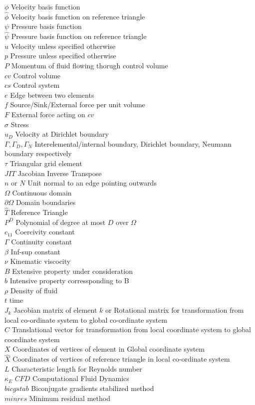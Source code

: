 \documentclass[a4paper,12pt]{book}
\begin{document}
$\phi$ Velocity basis function\\
$\hat{\phi}$ Velocity basis function on reference triangle\\
$\psi$ Pressure basis function\\
$\hat{\psi}$ Pressure basis function on reference triangle\\
$u$ Velocity unless specified otherwise\\
$p$ Pressure unless specified otherwise\\
$P$ Momentum of fluid flowing thorugh control volume\\
$cv$ Control volume\\
$cs$ Control system\\
$e$ Edge between two elements\\ 
$f$ Source/Sink/External force per unit volume\\
$F$ External force acting on $cv$\\
$\sigma$ Stress\\
$u_D$ Velocity at Dirichlet boundary\\
$\Gamma, \Gamma_D, \Gamma_N$ Interelemental/internal boundary, Dirichlet boundary, Neumann boundary respectively\\
$\tau$ Triangular grid element\\
$JIT$ Jacobian Inverse Transpose\\
$n$ or $N$ Unit normal to an edge pointing outwards\\
$\Omega$ Continuous domain\\
$\partial \Omega$ Domain boundaries\\
$\hat{T}$ Reference Triangle\\
$P^D$ Polynomial of degree at most $D$ over $\Omega$\\
$c_{11}$ Coercivity constant\\
$\Gamma$ Continuity constant\\
$\beta$ Inf-sup constant\\
$\nu$ Kinematic viscocity\\
$B$ Extensive property under consideration  \\
$b$ Intensive property corressponding to B \\
$\rho$ Density of fluid \\
$t$ time\\
$J_k$ Jacobian matrix of element $k$ or Rotational matrix for transformation from local co-ordinate system to global co-ordinate system\\
$C$ Translational vector for transformation from local coordinate system to global coordinate system\\
$X$ Coordinates of vertices of element in Global coordinate system\\
$\hat{X}$ Coordinates of vertices of reference triangle in local co-ordinate system\\
$L$ Characteristic length for Reynolds number\\
$\kappa_E$
$CFD$ Computational Fluid Dynamics\\
$bicgstab$ Biconjugate gradients stabilized method\\
$minres$ Minimum residual method\\
\end{document}
